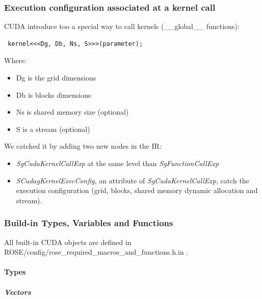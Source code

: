 			\subsubsection{Execution configuration associated at a kernel call}

CUDA introduce too a special way to call kernels (\_\_global\_\_ functions):
\begin{verbatim} kernel<<<Dg, Db, Ns, S>>>(parameter); \end{verbatim}
Where:
\begin{itemize}
	\item Dg is the grid dimensions
	\item Db is blocks dimensions
	\item Ns is shared memory size (optional)
	\item S is a stream (optional)
\end{itemize}
We catched it by adding two new nodes in the IR: 
\begin{itemize}
	\item \emph{SgCudaKernelCallExp} at the same level than \emph{SgFunctionCallExp}
	\item \emph{SCudagKernelExecConfig}, an attribute of \emph{SgCudaKernelCallExp}, catch the execution configuration (grid, blocks, shared memory dynamic allocation and stream).
\end{itemize}

			\subsubsection{Build-in Types, Variables and Functions}
			
All built-in CUDA objects are defined in ROSE/config/rose\_required\_macros\_and\_functions.h.in .
			
				\paragraph{Types}
			
					\subparagraph{Vectors}
					
